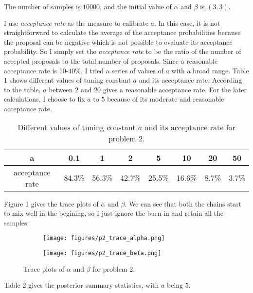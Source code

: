 \documentclass[12pt]{article}
\begin{document}
The number of samples is $10000$, and the initial value of $\alpha$ and $\beta$ is $(3,3)$.

I use \textit{acceptance rate} as the measure to calibrate $a$. In this case, it is not straightforward to calculate the average of the acceptance probabilities because the proposal can be negative which is not possible to evaluate its acceptance probability. So I simply set the \textit{acceptance rate} to be the ratio of the number of accepted proposals to the total number of proposals. Since a reasonable acceptance rate is 10-40\%, I tried a series of values of $a$ with a broad range. Table 1 shows different values of tuning constant $a$ and its acceptance rate. According to the table, $a$ between $2$ and $20$ gives a reasonable acceptance rate. For the later calculations, I choose to fix $a$ to $5$ because of its moderate and reasonable acceptance rate.

\begin{table}[H]
\centering
\caption{Different values of tuning constant $a$ and its acceptance rate for problem 2.}
\label{my-label}
\begin{tabular}{|c|c|c|c|c|c|c|c|}
\hline
a               & 0.1    & 1      & 2      & 5      & 10     & 20    & 50    \\ \hline
acceptance rate & 84.3\% & 56.3\% & 42.7\% & 25.5\% & 16.6\% & 8.7\% & 3.7\% \\ \hline
\end{tabular}
\end{table}

Figure 1 gives the trace plots of $\alpha$ and $\beta$. We can see that both the chains start to mix well in the begining, so I just ignore the burn-in and retain all the samples.

\begin{figure}[H]
\begin{subfigure}{.5\textwidth}
  \centering
  \texttt{[image: figures/p2\_trace\_alpha.png]}
\end{subfigure}
\begin{subfigure}{.5\textwidth}
  \centering
  \texttt{[image: figures/p2\_trace\_beta.png]}
\end{subfigure}
\caption{Trace plots of $\alpha$ and $\beta$ for problem 2.}
\end{figure}

Table 2 gives the posterior summary statistics, with $a$ being $5$.
\end{document}

